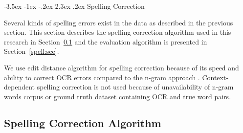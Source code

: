 \documentclass[12pt]{article}
\makeatletter
\renewcommand\section{\@startsection{section}{1}{\z@}%
                                  {-3.5ex \@plus -1ex \@minus -.2ex}%
                                  {2.3ex \@plus.2ex}%
                                  {\normalfont\bfseries}}
\makeatother
\begin{document}
\section{Spelling Correction}

Several kinds of spelling errors exist in the data as described in the previous section. 
 This section describes the spelling correction algorithm used in this research  in Section~\ref{spell:algo} and the evaluation algorithm is presented in Section~\ref{spell:sce}.





  
 We use edit distance algorithm for spelling correction because of its speed and ability to correct OCR errors compared to the n-gram approach \cite{chattopadhyaya2013fast}. Context-dependent spelling correction is not used because of unavailability of n-gram words corpus or ground truth dataset containing OCR and true word pairs.


\subsection{Spelling Correction Algorithm}
\label{spell:algo}
\end{document}
